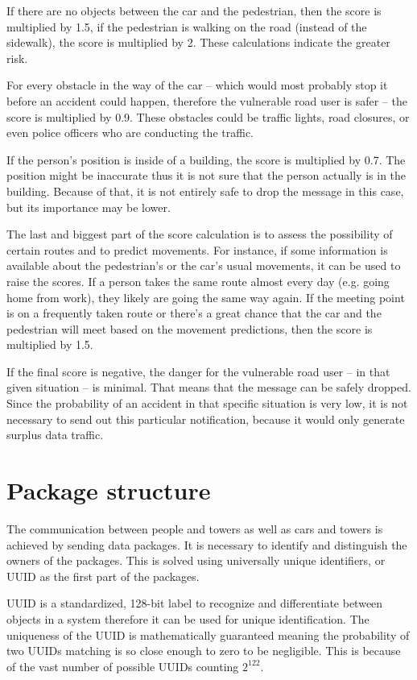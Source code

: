 \documentclass[conference]{IEEEtran}
\begin{document}
If there are no objects between the car and the pedestrian, then the score is multiplied by 1.5, if the pedestrian is walking on the road (instead of the sidewalk), the score is multiplied by 2. These calculations indicate the greater risk.

For every obstacle in the way of the car -- which would most probably stop it before an accident could happen, therefore the vulnerable road user is safer -- the score is multiplied by 0.9. These obstacles could be traffic lights, road closures, or even police officers who are conducting the traffic.

If the person’s position is inside of a building, the score is multiplied by 0.7. The position might be inaccurate thus it is not sure that the person actually is in the building. Because of that, it is not entirely safe to drop the message in this case, but its importance may be lower.

The last and biggest part of the score calculation is to assess the possibility of certain routes and to predict movements. For instance, if some information is available about the pedestrian's or the car's usual movements, it can be used to raise the scores. If a person takes the same route almost every day (e.g. going home from work), they likely are going the same way again. If the meeting point is on a frequently taken route or there's a great chance that the car and the pedestrian will meet based on the movement predictions, then the score is multiplied by 1.5.

If the final score is negative, the danger for the vulnerable road user -- in that given situation -- is minimal. That means that the message can be safely dropped. Since the probability of an accident in that specific situation is very low, it is not necessary to send out this particular notification, because it would only generate surplus data traffic.

\section{Package structure}

The communication between people and towers as well as cars and towers is achieved by sending data packages. It is necessary to identify and distinguish the owners of the packages. This is solved using universally unique identifiers, or UUID as the first part of the packages.

UUID is a standardized, 128-bit label to recognize and differentiate between objects in a system therefore it can be used for unique identification. The uniqueness of the UUID is mathematically guaranteed meaning the probability of two UUIDs matching is so close enough to zero to be negligible. This is because of the vast number of possible UUIDs counting $2^{122}$.
\end{document}
